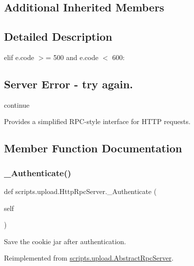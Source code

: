 \subsection*{Additional Inherited Members}


\subsection{Detailed Description}
elif e.\+code $>$= 500 and e.\+code $<$ 600\+: 

\subsection*{Server Error -\/ try again.}

continue \begin{DoxyVerb}Provides a simplified RPC-style interface for HTTP requests.\end{DoxyVerb}
 

\subsection{Member Function Documentation}
\mbox{\label{classscripts_1_1upload_1_1_http_rpc_server_a61268eda38c588475463218af8a050e0}} 
\subsubsection{\texorpdfstring{\_Authenticate()}{\_Authenticate()}}
{\footnotesize\ttfamily def scripts.\+upload.\+Http\+Rpc\+Server.\+\_\+\+Authenticate (\begin{DoxyParamCaption}\item[{}]{self }\end{DoxyParamCaption})\hspace{0.3cm}{\ttfamily [private]}}

\begin{DoxyVerb}Save the cookie jar after authentication.\end{DoxyVerb}
 

Reimplemented from \mbox{\hyperlink{classscripts_1_1upload_1_1_abstract_rpc_server_a8b77ab8f04694ca25cb4f3a627e3fc18}{scripts.\+upload.\+Abstract\+Rpc\+Server}}.

\mbox{\label{classscripts_1_1upload_1_1_http_rpc_server_a44de63ab67503b0d11fd37c1c3a22124}} 

